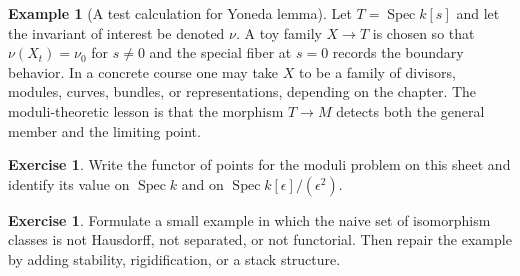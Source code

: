 \documentclass[11pt]{amsart}
\theoremstyle{definition}
\newtheorem{example}[theorem]{Example}
\newtheorem{exercise}[theorem]{Exercise}
\newcommand{\Spec}{\operatorname{Spec}}
\begin{document}
\begin{example}[A test calculation for Yoneda lemma]
Let $T=\Spec k[s]$ and let the invariant of interest be denoted $\nu$.  A toy family $X\to T$ is chosen so that $\nu(X_t)=\nu_0$ for $s\ne0$ and the special fiber at $s=0$ records the boundary behavior.  In a concrete course one may take $X$ to be a family of divisors, modules, curves, bundles, or representations, depending on the chapter.  The moduli-theoretic lesson is that the morphism $T\to M$ detects both the general member and the limiting point.
\end{example}
\begin{exercise}
Write the functor of points for the moduli problem on this sheet and identify its value on $\Spec k$ and on $\Spec k[\epsilon]/(\epsilon^2)$.
\end{exercise}
\begin{exercise}
Formulate a small example in which the naive set of isomorphism classes is not Hausdorff, not separated, or not functorial.  Then repair the example by adding stability, rigidification, or a stack structure.
\end{exercise}
\clearpage
\end{document}
